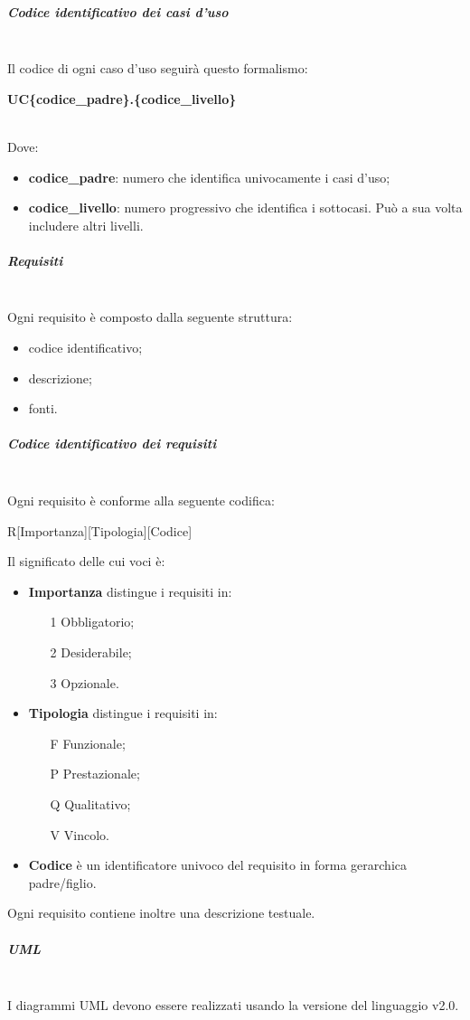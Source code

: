 \subparagraph{Codice identificativo dei casi d'uso} \mbox{}\\
Il codice di ogni caso d'uso seguirà questo formalismo: \\
\centerline{\textbf{UC\{codice\_padre\}.\{codice\_livello\}}} \\
Dove:
\begin{itemize}
	\item \textbf{codice\_padre}: numero che identifica univocamente i casi d'uso;
	\item \textbf{codice\_livello}: numero progressivo che identifica i sottocasi. Può a sua volta includere altri livelli.
\end{itemize}
\subparagraph{Requisiti} \mbox{}\\
Ogni requisito è composto dalla seguente struttura:
\begin{itemize}
	\item codice identificativo;
	\item descrizione;
	\item fonti.
\end{itemize}
\subparagraph{Codice identificativo dei requisiti} \mbox{}\\
Ogni requisito è conforme alla seguente codifica:\newline
\centerline{R[Importanza][Tipologia][Codice]}\newline
Il significato delle cui voci è:
\begin{itemize}
	\item \textbf{Importanza} distingue i requisiti in:
	\begin{itemize}
		\item[1] Obbligatorio;
		\item[2] Desiderabile;
		\item[3] Opzionale.
	\end{itemize}
	\item \textbf{Tipologia} distingue i requisiti in:
	\begin{itemize}
		\item[F] Funzionale;
		\item[P] Prestazionale;
		\item[Q] Qualitativo;
		\item[V] Vincolo.
	\end{itemize}
	\item \textbf{Codice} è un identificatore univoco del requisito in forma gerarchica padre/figlio.
\end{itemize}
Ogni requisito contiene inoltre una descrizione testuale.
\subparagraph{UML} \mbox{}\\
I diagrammi UML devono essere realizzati usando la versione del linguaggio v2.0.

